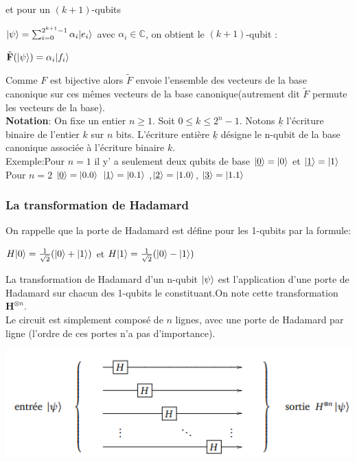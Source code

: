 \documentclass[12pt,openany]{report}
\DeclarePairedDelimiter\ket{\lvert}{\rangle}
\begin{document}
et pour un $(k+1)$-qubits 
\begin{center}
$ \ket{\psi}=\sum_{i=0}^{2^{k+1}-1}\alpha_i \ket{e_i} $ avec $\alpha_i \in \mathbb{C}  $, on obtient le $(k+1)$-qubit :
\end{center}
\begin{center}
$ \tilde{\mathbf{F}}(\ket{\psi})=\alpha_i \ket{f_i} $
\end{center}

Comme $F $ est bijective alors $\tilde{F} $ envoie l'ensemble des vecteurs de la base canonique sur ces mêmes vecteurs de la base canonique(autrement dit $\tilde{F} $ permute les vecteurs de la base).\\
\textbf{Notation}: On fixe un entier $ n \geq 1  $. Soit  $ 0 \leq k \leq 2^{n}-1$. Notons $ \underline{k} $ l'écriture binaire de l'entier $k$ sur $n$ bits. L'écriture entière $ \underline{k} $ désigne le n-qubit de la base canonique associée à l'écriture binaire $k$.\\
Exemple:Pour $n=1 $ il y' a seulement deux qubits de base $\ket{\underline{0}}=\ket{0} $ et $\ket{\underline{1}}=\ket{1} $ \\Pour $ n=2 $ $\ket{\underline{0}}=\ket{0.0} $ $\ket{\underline{1}}=\ket{0.1} $ ,$\ket{\underline{2}}=\ket{1.0} $,
$\ket{\underline{3}}=\ket{1.1} $

\subsubsection{La transformation de Hadamard}

On rappelle que la porte de Hadamard est défine pour les 1-qubits par la formule:


\begin{center}

$ H\ket{0}=\frac{1}{\sqrt{2}}(\ket{0}+ \ket{1}) $ et $ H\ket{1}=\frac{1}{\sqrt{2}}(\ket{0}- \ket{1}) $
\end{center}
La transformation de Hadamard d'un n-qubit $\ket{\psi} $ est l'application d'une porte de Hadamard sur chacun des 1-qubits le constituant.On note cette transformation $ \mathbf{H}^{\otimes n} $.\\ Le circuit est simplement composé de $n$ lignes, avec une porte de Hadamard par ligne (l'ordre de ces portes n'a pas d'importance).

\begin{center}
\includegraphics[scale=1]{./schadamard}
\end{center}
\end{document}
